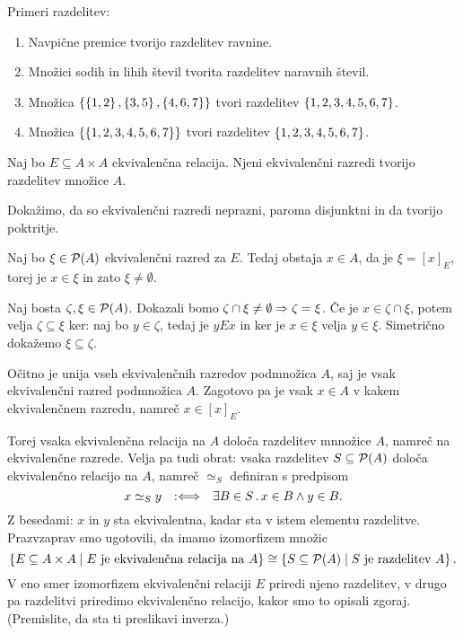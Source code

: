 \begin{primer}
  Primeri razdelitev:
  \begin{enumerate}
  \item Navpične premice tvorijo razdelitev ravnine.
  \item Množici sodih in lihih števil tvorita razdelitev naravnih števil.
  \item Množica $\left\{\left\{1,2\right\}, \left\{3,5\right\}, \left\{4,6,7\right\}\right\}$ tvori razdelitev $\left\{1,2,3,4,5,6,7\right\}$.
  \item Množica $\left\{\left\{1,2,3,4,5,6,7\right\}\right\}$ tvori razdelitev $\left\{1,2,3,4,5,6,7\right\}$.
  \end{enumerate}
\end{primer}

\begin{izrek}
  Naj bo $E \subseteq A \times A$ ekvivalenčna relacija. Njeni ekvivalenčni razredi tvorijo
  razdelitev množice $A$.
\end{izrek}

\begin{dokaz}
  Dokažimo, da so ekvivalenčni razredi neprazni, paroma disjunktni in da tvorijo poktritje.

  Naj bo $\xi \in \mathcal{P}(A)$ ekvivalenčni razred za $E$. Tedaj obstaja $x \in A$, da je $\xi = [x]_E$,
  torej je $x \in \xi$ in zato $\xi \neq \emptyset$.

  Naj bosta $\zeta, \xi \in \mathcal{P}(A)$. Dokazali bomo $\zeta \cap \xi \neq \emptyset \Rightarrow \zeta = \xi$. Če je $x \in \zeta \cap \xi$, potem velja $\zeta \subseteq \xi$ ker: naj bo $y \in \zeta$, tedaj je $y E x$ in ker je $x \in \xi$ velja $y \in \xi$. Simetrično dokažemo $\xi \subseteq \zeta$.

  Očitno je unija vseh ekvivalenčnih razredov podmnožica $A$, saj je vsak ekvivalenčni razred podmnožica $A$. Zagotovo
  pa je vsak $x \in A$ v kakem ekvivalenčnem razredu, namreč $x \in [x]_E$.
\end{dokaz}

Torej vsaka ekvivalenčna relacija na $A$ določa razdelitev mnnožice $A$, namreč na
ekvivalenčne razrede. Velja pa tudi obrat: vsaka razdelitev $S \subseteq \mathcal{P}(A)$ določa ekvivalenčno
relacijo na $A$, namreč $\simeq_S$ definiran s predpisom
\begin{equation*}
    x \simeq_S y \quad {{:}{\Longleftrightarrow}}\quad \exists B \in S \,.\, x \in B \land y \in B.
\end{equation*}
%
Z besedami: $x$ in $y$ sta ekvivalentna, kadar sta v istem elementu razdelitve. Prazvzaprav
smo ugotovili, da imamo izomorfizem množic
%
\begin{equation*}
  \left\{ E \subseteq A \times A \; \middle| \; \text{$E$ je ekvivalenčna relacija na $A$} \right\} \cong
  \left\{ S \subseteq \mathcal{P}(A) \; \middle| \; \text{$S$ je razdelitev $A$} \right\}.
\end{equation*}
%
V eno smer izomorfizem ekvivalenčni relaciji $E$ priredi njeno razdelitev, v drugo pa razdelitvi priredimo ekvivalenčno
relacijo, kakor smo to opisali zgoraj. (Premislite, da sta ti preslikavi inverza.)


